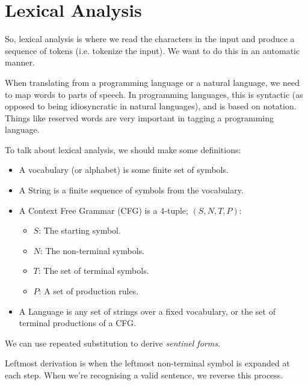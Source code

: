 
\section{Lexical Analysis}

So, lexical analysis is where we read the characters in the input and produce a
sequence of tokens (i.e. tokenize the input). We want to do this in an automatic
manner.

When translating from a programming language or a natural language, we need to
map words to parts of speech. In programming languages, this is syntactic (as
opposed to being idiosyncratic in natural languages), and is based on notation.
Things like reserved words are very important in tagging a programming language.

To talk about lexical analysis, we should make some definitions:


\begin{itemize}
  \item A vocabulary (or alphabet) is some finite set of symbols.
  \item A String is a finite sequence of symbols from the vocabulary.
  \item A Context Free Grammar (CFG) is a 4-tuple; $(S,N,T,P)$:
    \begin{itemize}
      \item $S$: The starting symbol.
      \item $N$: The non-terminal symbols.
      \item $T$: The set of terminal symbols.
      \item $P$: A set of production rules.
    \end{itemize}
  \item A Language is any set of strings over a fixed vocabulary, or the set of
  terminal productions of a CFG. 
\end{itemize}

We can use repeated substitution to derive \textit{sentinel forms}.

Leftmost derivation is when the leftmost non-terminal symbol is expanded at each
step. When we're recognising a valid sentence, we reverse this process.

